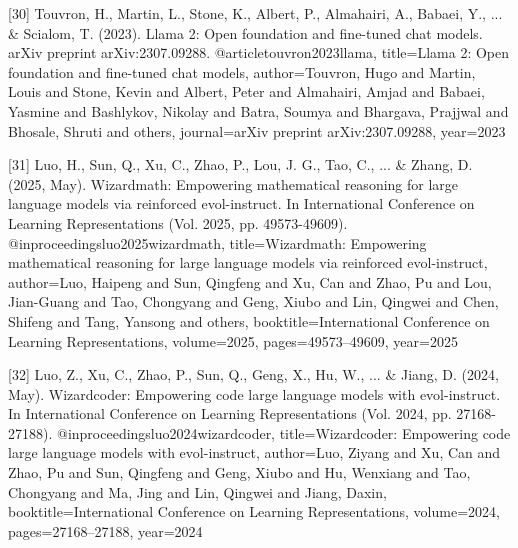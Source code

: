 \documentclass{article}
\begin{document}
{%

[30] Touvron, H., Martin, L., Stone, K., Albert, P., Almahairi, A., Babaei, Y., ... & Scialom, T. (2023). Llama 2: Open foundation and fine-tuned chat models. arXiv preprint arXiv:2307.09288.
@article{touvron2023llama,
  title={Llama 2: Open foundation and fine-tuned chat models},
  author={Touvron, Hugo and Martin, Louis and Stone, Kevin and Albert, Peter and Almahairi, Amjad and Babaei, Yasmine and Bashlykov, Nikolay and Batra, Soumya and Bhargava, Prajjwal and Bhosale, Shruti and others},
  journal={arXiv preprint arXiv:2307.09288},
  year={2023}
}

[31] Luo, H., Sun, Q., Xu, C., Zhao, P., Lou, J. G., Tao, C., ... & Zhang, D. (2025, May). Wizardmath: Empowering mathematical reasoning for large language models via reinforced evol-instruct. In International Conference on Learning Representations (Vol. 2025, pp. 49573-49609).
@inproceedings{luo2025wizardmath,
  title={Wizardmath: Empowering mathematical reasoning for large language models via reinforced evol-instruct},
  author={Luo, Haipeng and Sun, Qingfeng and Xu, Can and Zhao, Pu and Lou, Jian-Guang and Tao, Chongyang and Geng, Xiubo and Lin, Qingwei and Chen, Shifeng and Tang, Yansong and others},
  booktitle={International Conference on Learning Representations},
  volume={2025},
  pages={49573--49609},
  year={2025}
}


[32] Luo, Z., Xu, C., Zhao, P., Sun, Q., Geng, X., Hu, W., ... & Jiang, D. (2024, May). Wizardcoder: Empowering code large language models with evol-instruct. In International Conference on Learning Representations (Vol. 2024, pp. 27168-27188).
@inproceedings{luo2024wizardcoder,
  title={Wizardcoder: Empowering code large language models with evol-instruct},
  author={Luo, Ziyang and Xu, Can and Zhao, Pu and Sun, Qingfeng and Geng, Xiubo and Hu, Wenxiang and Tao, Chongyang and Ma, Jing and Lin, Qingwei and Jiang, Daxin},
  booktitle={International Conference on Learning Representations},
  volume={2024},
  pages={27168--27188},
  year={2024}
}

}
\end{document}

